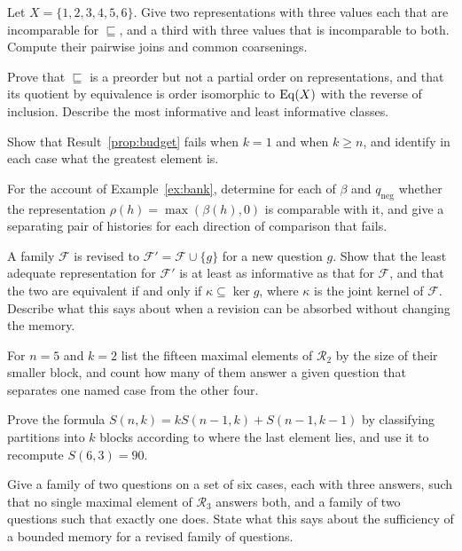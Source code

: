 \begin{exercise}
Let $X=\{1,2,3,4,5,6\}$. Give two representations with three values each that are incomparable for $\sqsubseteq$, and a third with three values that is incomparable to both. Compute their pairwise joins and common coarsenings.
\end{exercise}

\begin{exercise}
Prove that $\sqsubseteq$ is a preorder but not a partial order on representations, and that its quotient by equivalence is order isomorphic to $\operatorname{Eq}(X)$ with the reverse of inclusion. Describe the most informative and least informative classes.
\end{exercise}

\begin{exercise}
Show that Result~\ref{prop:budget} fails when $k=1$ and when $k\ge n$, and identify in each case what the greatest element is.
\end{exercise}

\begin{exercise}
For the account of Example~\ref{ex:bank}, determine for each of $\beta$ and $q_{\mathrm{neg}}$ whether the representation $\rho(h)=\max(\beta(h),0)$ is comparable with it, and give a separating pair of histories for each direction of comparison that fails.
\end{exercise}

\begin{exercise}
A family $\mathcal F$ is revised to $\mathcal F'=\mathcal F\cup\{g\}$ for a new question $g$. Show that the least adequate representation for $\mathcal F'$ is at least as informative as that for $\mathcal F$, and that the two are equivalent if and only if $\kappa\subseteq\ker g$, where $\kappa$ is the joint kernel of $\mathcal F$. Describe what this says about when a revision can be absorbed without changing the memory.
\end{exercise}


\begin{exercise}
For $n=5$ and $k=2$ list the fifteen maximal elements of $\mathcal R_2$ by the size of their smaller block, and count how many of them answer a given question that separates one named case from the other four.\label{ex:fifteen}
\end{exercise}

\begin{exercise}
Prove the formula $S(n,k)=kS(n-1,k)+S(n-1,k-1)$ by classifying partitions into $k$ blocks according to where the last element lies, and use it to recompute $S(6,3)=90$.\label{ex:stirling}
\end{exercise}

\begin{exercise}
Give a family of two questions on a set of six cases, each with three answers, such that no single maximal element of $\mathcal R_3$ answers both, and a family of two questions such that exactly one does. State what this says about the sufficiency of a bounded memory for a revised family of questions.
\end{exercise}

